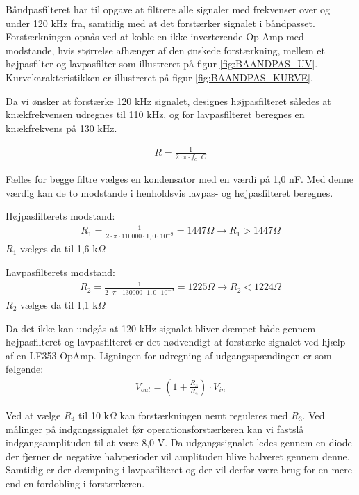 Båndpasfilteret har til opgave at filtrere alle signaler med frekvenser over og under 120 kHz fra, samtidig med at det forstærker signalet i båndpasset. Forstærkningen opnås ved at koble en ikke inverterende Op-Amp med modstande, hvis størrelse afhænger af den ønskede forstærkning, mellem et højpasfilter og lavpasfilter som illustreret på figur \ref{fig:BAANDPAS_UV}. Kurvekarakteristikken er illustreret på figur \ref{fig:BAANDPAS_KURVE}.

Da vi ønsker at forstærke 120 kHz signalet, designes højpasfilteret således at knækfrekvensen udregnes til 110 kHz, og for lavpasfilteret beregnes en knækfrekvens på 130 kHz. 

\begin{align}
R = \frac{1}{2 \cdot \pi \cdot f_c \cdot C } 
\end{align}

Fælles for begge filtre vælges en kondensator med en værdi på 1,0 nF. Med denne værdig kan de to modstande i henholdsvis lavpas- og højpasfilteret beregnes.

Højpasfilterets modstand:
\begin{align}
R_1 = \frac{1}{2 \cdot \pi \cdot 110000 \cdot 1,0 \cdot 10^{-9}} = 1447 \Omega
\rightarrow R_1 > 1447 \Omega
\end{align}
$R_1$ vælges da til 1,6 k$\Omega$


Lavpasfilterets modstand:
\begin{align}
R_2 = \frac{1}{2 \cdot \pi \cdot \ 130000 \cdot 1,0 \cdot 10^{-9}} = 1225 \Omega
\rightarrow R_2 < 1224 \Omega
\end{align}
$R_2$ vælges da til 1,1 k$\Omega$

Da det ikke kan undgås at 120 kHz signalet bliver dæmpet både gennem højpasfilteret og lavpasfilteret er det nødvendigt at forstærke signalet ved hjælp af en LF353 OpAmp.
Ligningen for udregning af udgangsspændingen er som følgende:
\begin{align}
V_{out} = (1 + \frac{R_3}{R_4}) \cdot V_{in}
\end{align} 

Ved at vælge $R_4$ til 10 k$\Omega$ kan forstærkningen nemt reguleres med $R_3$.
Ved målinger på indgangssignalet før operationsforstærkeren kan vi fastslå indgangsamplituden til at være 8,0 V. Da udgangssignalet ledes gennem en diode der fjerner de negative halvperioder vil amplituden blive halveret gennem denne. Samtidig er der dæmpning i lavpasfilteret og der vil derfor være brug for en mere end en fordobling i forstærkeren. 

